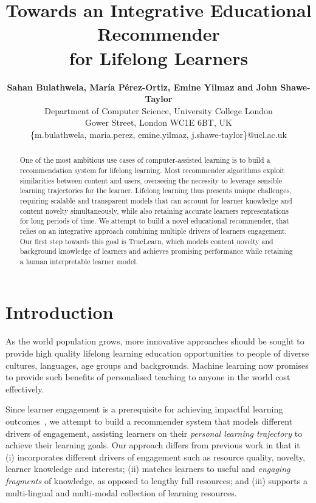 \documentclass[letterpaper]{article} %
\title{Towards an Integrative Educational Recommender \\ for Lifelong Learners
}
\author{
\Large \textbf{Sahan Bulathwela, Mar\'ia P\'erez-Ortiz, Emine Yilmaz and John Shawe-Taylor}\\ %
Department of Computer Science, University College London \\
Gower Street, London WC1E 6BT, UK\\ %
\{m.bulathwela, maria.perez, emine.yilmaz, j.shawe-taylor\}@ucl.ac.uk  %
}
\begin{document}
 \maketitle

\begin{abstract}

One of the most ambitious use cases of computer-assisted learning is to build a recommendation system for lifelong learning. Most recommender algorithms exploit similarities between content and users, overseeing the necessity to leverage sensible learning trajectories for the learner. Lifelong learning thus presents unique challenges, requiring scalable and transparent models that can account for learner knowledge and content novelty simultaneously, while also retaining accurate learners representations for long periods of time. We attempt to build a novel educational recommender, that relies on an integrative approach combining multiple drivers of learners engagement. Our first step towards this goal is TrueLearn, which models content novelty and background knowledge of learners and achieves promising performance while retaining a human interpretable learner model.


\end{abstract}

\section{Introduction}
As the world population grows, more innovative approaches should be sought to provide  high quality lifelong learning education opportunities to people of diverse cultures, languages, age groups and backgrounds.
Machine learning now promises to provide such benefits of personalised teaching to anyone in the world cost effectively.



 Since learner engagement is a prerequisite for achieving impactful learning outcomes~\cite{lan2017behavior}, we attempt to build a recommender system that models different drivers of engagement,
assisting learners on their \emph{personal learning trajectory} to achieve their learning goals. Our approach differs from previous work in that it (i) incorporates different drivers of engagement such as resource quality, novelty, learner knowledge and interests; (ii) matches learners to useful and \emph{engaging fragments} of knowledge, as opposed to lengthy full resources; and (iii) supports a multi-lingual and multi-modal collection of learning resources.
\end{document}
